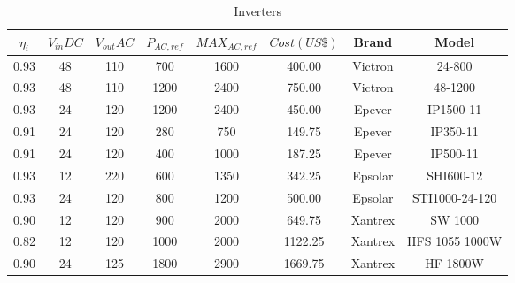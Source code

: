 \documentclass[journal,onecolumn]{IEEEtran}
\begin{document}
\begin{table}[h]
\renewcommand{\arraystretch}{1.3}
\caption{Inverters}\label{tab:inverter}
\centering
\begin{scriptsize}
\begin{tabular}{c|c|c|c|c|c|c|c}
\hline
\hline
$\eta_{i}$ & $V_{in}DC$  & $V_{out}AC$ & $P_{AC,ref}$  & $MAX_{AC,ref}$ & $Cost (US\$)$ & Brand & Model\\
\hline
\hline
0.93 & 48 & 110 & 700 & 1600 & 400.00 & Victron & 24-800 \\
\hline
0.93 & 48 & 110 & 1200 & 2400 & 750.00 & Victron & 48-1200 \\
\hline
0.93 & 24 & 120 & 1200 & 2400 & 450.00 & Epever & IP1500-11 \\
\hline
0.91 & 24 & 120 & 280 & 750 & 149.75 & Epever & IP350-11 \\
\hline
0.91 & 24 & 120 & 400 & 1000 & 187.25 & Epever &  IP500-11 \\
\hline
0.93 & 12 & 220 & 600 & 1350 & 342.25 & Epsolar & SHI600-12 \\
\hline
0.93 & 24 & 120 & 800 & 1200 & 500.00 & Epsolar & STI1000-24-120 \\
\hline
0.90 & 12 & 120 & 900 & 2000 & 649.75 & Xantrex & SW 1000 \\
\hline
0.82 & 12 & 120 & 1000 & 2000 & 1122.25 & Xantrex & HFS 1055 1000W \\
\hline
0.90 & 24 & 125 & 1800 & 2900 & 1669.75 & Xantrex & HF 1800W \\
\hline
\hline
\end{tabular}
\end{scriptsize}
\end{table}

\end{document}
